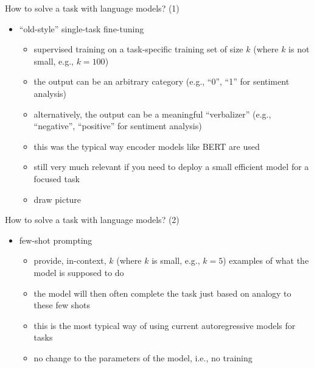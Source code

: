 \begin{frame}{How to solve a task with language models? (1)}

\vfill

\begin{itemize}
    \item ``old-style'' single-task fine-tuning 
        \begin{itemize}
            \item supervised training on a task-specific
        training set of size $k$ (where $k$ is not small,
        e.g., $k=100$)
        \item the output can be an arbitrary category (e.g.,
        ``0'', ``1'' for sentiment analysis)
            \item alternatively, the output can be a
        meaningful ``verbalizer'' (e.g., ``negative'',
        ``positive'' for sentiment analysis)
        \item this was the typical way encoder models like
        BERT are used
        \item still very much relevant if you need to deploy
        a small efficient model for a focused task
\item draw picture
        \end{itemize}
\end{itemize}

\vfill

\end{frame}












\begin{frame}{How to solve a task with language models? (2)}

\vfill

\begin{itemize}
    \item few-shot prompting
        \begin{itemize}
            \item provide, in-context,  $k$ (where $k$ is small, e.g., $k=5$) examples of what the model is
supposed to do
        \item the model will then often complete the task
        just based on analogy to these few shots
        \item this is the most typical way of using current
        autoregressive models for tasks
\item no change to the parameters of the model, i.e., no training
\end{itemize}
\end{itemize}

\vfill

\end{frame}

